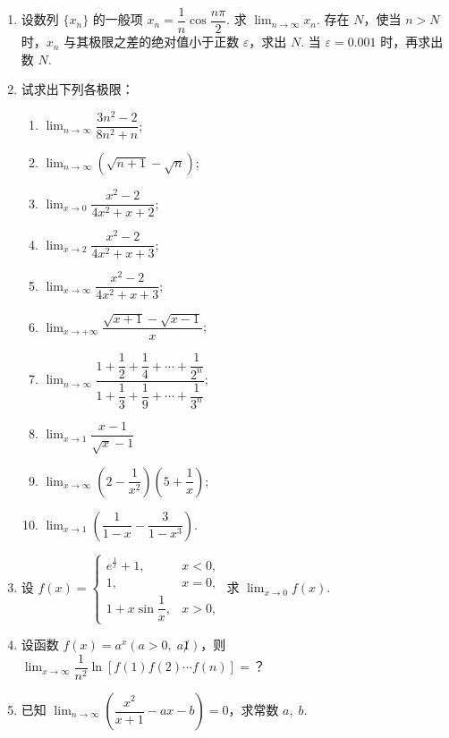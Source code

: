 \begin{enumerate}
    \item 设数列 $\{x_n\}$ 的一般项 $x_n=\dfrac{1}{n}\cos\dfrac{n\pi}{2}$. 求 $\displaystyle\lim_{n\to\infty}x_n$. 
    存在 $N$，使当 $n>N$ 时，$x_n$ 与其极限之差的绝对值小于正数 $\varepsilon$，求出 $N$. 当 $\varepsilon=0.001$ 时，再求出数 $N$.

    \item 试求出下列各极限：
    \begin{enumerate}[(1)]\setlength{\itemsep}{5pt}\setlength{\topsep}{15pt}
        \item $\displaystyle\lim_{n\to\infty}\dfrac{3n^2-2}{8n^2+n}$;
        \item $\displaystyle\lim_{n\to\infty}(\sqrt{n+1}-\sqrt{n})$;
        \item $\displaystyle\lim_{x\to0}\dfrac{x^2-2}{4x^2+x+2}$;
        \item $\displaystyle\lim_{x\to2}\dfrac{x^2-2}{4x^2+x+3}$;
        \item $\displaystyle\lim_{x\to\infty}\dfrac{x^2-2}{4x^2+x+3}$;
        \item $\displaystyle\lim_{x\to+\infty}\dfrac{\sqrt{x+1}-\sqrt{x-1}}{x}$;
        \item $\displaystyle\lim_{n\to\infty}\dfrac{1+\dfrac{1}{2}+\dfrac{1}{4}+\cdots+\dfrac{1}{2^n}}{1+\dfrac{1}{3}+\dfrac{1}{9}+\cdots+\dfrac{1}{3^n}}$;
        \item $\displaystyle\lim_{x\to1}\dfrac{x-1}{\sqrt{x}-1}$
        \item $\displaystyle\lim_{x\to\infty}\left(2-\dfrac{1}{x^2}\right)\left(5+\dfrac{1}{x}\right)$;
        \item $\displaystyle\lim_{x\to1}\left(\dfrac{1}{1-x}-\dfrac{3}{1-x^3}\right)$.
    \end{enumerate}

    \item 设 $f(x)=\begin{cases}
        e^{\frac{1}{x}}+1,&x<0,\\
        1,&x=0,\\
        1+x\sin \dfrac{1}{x},&x>0,
    \end{cases}$
    求 $\displaystyle\lim_{x\to0}f(x)$.

    \item 设函数 $f(x)=a^x(a>0,\;a\not1)$，则 $\displaystyle\lim_{x\to\infty}\dfrac{1}{n^2}\ln[f(1)f(2)\cdots f(n)]=$？
    
    \item 已知 $\displaystyle\lim_{n\to\infty}\left(\dfrac{x^2}{x+1}-ax-b\right)=0$，求常数 $a,\;b$.
    

\end{enumerate}

